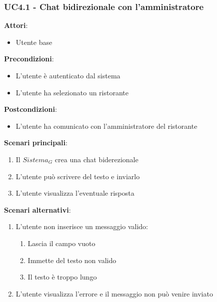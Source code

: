 \subsubsection{UC4.1 - Chat bidirezionale con l'amministratore}\label{usecase:4_1}
\textbf{Attori}:
\begin{itemize}
    \item Utente base
\end{itemize}
\textbf{Precondizioni}:
\begin{itemize}
    \item L'utente è autenticato dal sistema
    \item L'utente ha selezionato un ristorante
\end{itemize}
\textbf{Postcondizioni}:
\begin{itemize}
    \item L'utente ha comunicato con l'amministratore del ristorante
\end{itemize}
\textbf{Scenari principali}:
\begin{enumerate}
    \item Il $\textit{Sistema}_G$ crea una chat biderezionale
    \item L'utente può scrivere del testo e inviarlo
    \item L'utente visualizza l'eventuale risposta
\end{enumerate}
\textbf{Scenari alternativi}:
\begin{enumerate}
    \item L'utente non inserisce un messaggio valido:
    \begin{enumerate}
        \item Lascia il campo vuoto
        \item Immette del testo non valido
        \item Il testo è troppo lungo
    \end{enumerate}
    \item L'utente visualizza l'errore e il messaggio non può venire inviato
\end{enumerate}